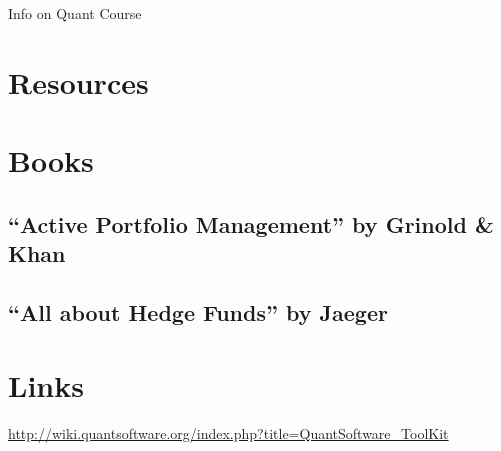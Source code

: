 \documentclass{article}
\begin{document}
\centerline{\Large Info on Quant Course}
\vspace{2pc}
\section*{Resources}
\section{Books}
\subsection *{``Active Portfolio Management'' by Grinold \& Khan}
\subsection*{``All about Hedge Funds'' by Jaeger}

\section{Links}
\url{http://wiki.quantsoftware.org/index.php?title=QuantSoftware_ToolKit}
\end{document}
